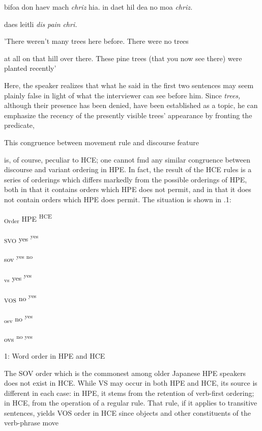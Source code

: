 \ea\label{ex:26}
 bifoa don haev mach \textit{chriz} hia. in daet hil dea no moa \textit{chriz.}
\glt
\z

daes leitli \textit{dis} \textit{pain} \textit{chri.}

'There weren't many trees here before. There were no trees

  


 


at all on that hill over there. These pine trees (that you now see there) were planted recently'

Here, the speaker realizes that what he said in the first two sentences may seem plainly false in light of what the interviewer can see before him. Since \textit{trees,} although their presence has been denied, have been established as a topic, he can emphasize the recency of the presently visible trees' appearance by fronting the predicate,

This congruence between movement rule and discourse feature

is, of course, peculiar to HCE; one cannot fmd any similar congruence between discourse and variant ordering in HPE. In fact, the result of the HCE rules is a series of orderings which differs markedly from the possible orderings of HPE, both in that it contains orders which HPE does not permit, and in that it does not contain orders which HPE does permit. The situation is shown in .1:

\textsubscript{Order }HPE \textsuperscript{HCE}

\textsubscript{SVO }yes \textsuperscript{yes}

sov \textsuperscript{yes no}

\textsubscript{vs }yes \textsuperscript{yes}

\textsubscript{VOS }no \textsuperscript{yes}

\textsubscript{osv }no \textsuperscript{yes}

ovs \textsuperscript{no yes}

\begin{table}
\caption{1: Word order in HPE and HCE}
\label{tab:1}
\end{table}

The SOV order which is the commonest among older Japanese HPE speakers does not exist in HCE. While VS may occur in both HPE and HCE, its source is different in each case: in HPE, it stems from the retention of verb-first ordering; in HCE, from the operation of a regular rule. That rule, if it applies to transitive sentences, yields VOS order in HCE since objects and other constituents of the verb-phrase move


